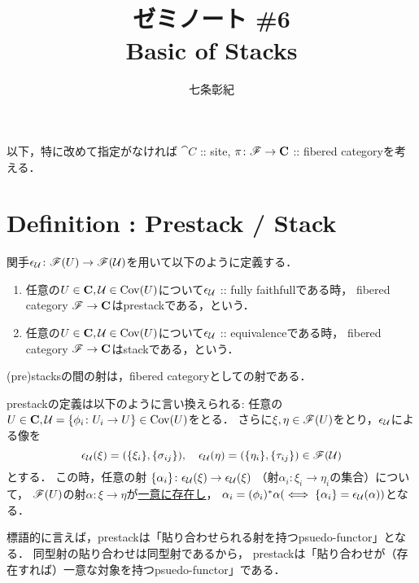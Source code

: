 \documentclass[a4paper]{jsarticle}
\begin{document}
\title{ゼミノート \#6 \\ Basic of Stacks}
\author{七条彰紀}
\maketitle
\tableofcontents

以下，特に改めて指定がなければ
$\cat{C}$ :: site, 
$\pi \colon \mathscr{F} \to \mathbf{C}$ :: fibered categoryを考える．

\section{Definition : Prestack / Stack }
\begin{Def}
    関手$\epsilon_{\mathcal{U}} \colon \mathscr{F}(U) \to \mathscr{F}(\mathcal{U})$を用いて以下のように定義する．
    \begin{enumerate}[label=(\roman*)]
    \item
        任意の$U \in \mathbf{C}, \mathcal{U} \in \operatorname{Cov}(U)$について$\epsilon_{\mathcal{U}}$ :: fully faithfullである時，
        fibered category $\mathscr{F} \to \mathbf{C}$はprestackである，という．
    \item
        任意の$U \in \mathbf{C}, \mathcal{U} \in \operatorname{Cov}(U)$について$\epsilon_{\mathcal{U}}$ :: equivalenceである時，
        fibered category $\mathscr{F} \to \mathbf{C}$はstackである，という．
    \end{enumerate}

    (pre)stacksの間の射は，fibered categoryとしての射である．
\end{Def}

\begin{Remark}
    prestackの定義は以下のように言い換えられる:
    任意の$U \in \mathbf{C}, \mathcal{U}=\{\phi_i \colon U_i \to U\} \in \operatorname{Cov}(U)$をとる．
    さらに$\xi, \eta \in \mathscr{F}(U)$をとり，$\epsilon_{\mathcal{U}}$による像を
    \[
        \epsilon_{\mathcal{U}}(\xi)=(\{\xi_i\}, \{\sigma_{ij}\}),\quad
        \epsilon_{\mathcal{U}}(\eta)=(\{\eta_i\}, \{\tau_{ij}\})
            \in \mathscr{F}(\mathcal{U}) 
    \]とする．
    この時，任意の射
    $\{\alpha_i\} \colon \epsilon_{\mathcal{U}}(\xi) \to \epsilon_{\mathcal{U}}(\xi)$
    （射$\alpha_i \colon \xi_i \to \eta_i$の集合）について，
    $\mathscr{F}(U)$の射$\alpha \colon \xi \to \eta$が\underline{一意に存在し}，
    $\alpha_i=(\phi_i)^*\alpha (\iff \{\alpha_i\}=\epsilon_{\mathcal{U}}(\alpha))$となる．

    標語的に言えば，prestackは「貼り合わせられる射を持つpsuedo-functor」となる．
    同型射の貼り合わせは同型射であるから，
    prestackは「貼り合わせが（存在すれば）一意な対象を持つpsuedo-functor」である．
\end{Remark}
\end{document}

